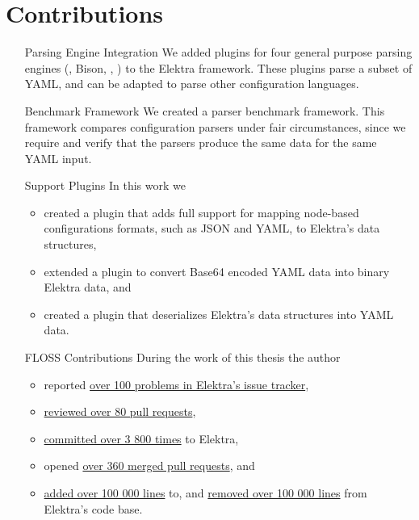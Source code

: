 
\section{Contributions}

\begin{itemize}[style=multiline, leftmargin=3cm, font=\bfseries]
  \item[Parsing Engine Integration] We added plugins for four general purpose parsing engines (, Bison, , ) to the Elektra framework. These plugins parse a subset of YAML, and can be adapted to parse other configuration languages.

  \item[Benchmark Framework] We created a parser benchmark framework. This framework compares configuration parsers under fair circumstances, since we require and verify that the parsers produce the same data for the same YAML input.

  \item[Support Plugins] In this work we
  \begin{itemize}
    \item created a plugin that adds full support for mapping node-based configurations formats, such as JSON and YAML, to Elektra’s data structures,
    \item extended a plugin to convert Base64 encoded YAML data into binary Elektra data, and
    \item created a plugin that deserializes Elektra’s data structures into YAML data.
  \end{itemize}

  \item[\gls{FLOSS} Contributions] During the work of this thesis the author

  \begin{itemize}
    \item reported \href{https://github.com/ElektraInitiative/libelektra/issues/created_by/sanssecours}{over 100 problems in Elektra’s issue tracker},
    \item \href{https://github.com/ElektraInitiative/libelektra/pulls?q=is%3Apr+is%3Aopen+reviewed-by%3Asanssecours}{reviewed over 80 pull requests},
    \item \href{https://github.com/ElektraInitiative/libelektra/graphs/contributors?from=2012-04-01&to=2019-09-30&type=c}{committed over 3 800 times} to Elektra,
    \item opened \href{https://github.com/ElektraInitiative/libelektra/pulls?q=is%3Apr+is%3Amerged+author%3Asanssecours}{over 360 merged pull requests}, and
    \item \href{https://github.com/ElektraInitiative/libelektra/graphs/contributors?from=2012-04-01&to=2019-09-30&type=a}{added over 100 000 lines} to, and \href{https://github.com/ElektraInitiative/libelektra/graphs/contributors?from=2012-04-01&to=2019-09-30&type=d}{removed over 100 000 lines} from Elektra’s code base.
  \end{itemize}
\end{itemize}

